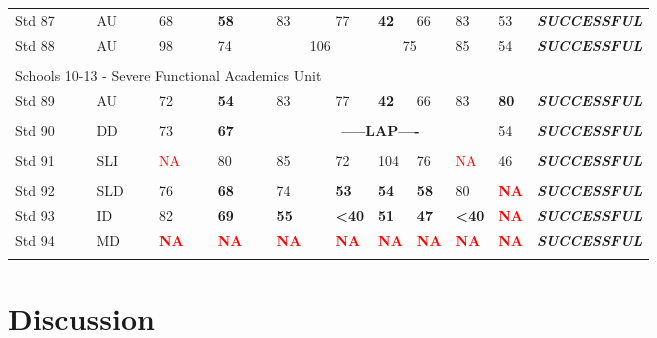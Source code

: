 \documentclass[twoside]{article}
\begin{document}
\begin{tiny}
\begin{landscape}
\begin{longtable}{p{1.5cm}p{1.5cm}p{1.5cm}p{1.5cm}p{1.75cm}p{1.75cm}p{1.75cm}p{1.75cm}p{1.75cm}p{1.75cm}p{2.5cm}@{}}
Std 87 & AU & 68 & \textbf{58} & 83 & 77 & \textbf{42} & 66 & 83 & 53 & \textbf{\textit{SUCCESSFUL}}\\
Std 88 & AU & 98 & 74 & \multicolumn{2}{c}{106} & \multicolumn{2}{c}{75} & 85 & 54 & \textbf{\textit{SUCCESSFUL}}\\
\hline \\
%
\multicolumn {5}{l}{Schools 10-13 - Severe Functional Academics Unit} & & & & & &\\
\cmidrule(lr){1-2}
Std 89 & AU & 72 & \textbf{54} & 83 & 77 & \textbf{42} & 66 & 83 & \textbf{80} & \textbf{\textit{SUCCESSFUL}}\\
\hline\\
Std 90 & DD & 73 & \textbf{67} & \multicolumn{5}{c}{\textbf{-----LAP----}}& 54 & \textbf{\textit{SUCCESSFUL}} \\
\hline\\
Std 91 & SLI & \textcolor{red}{NA} & 80 & 85 & 72 & 104 & 76 & \textcolor{red}{NA} & 46 & \textbf{\textit{SUCCESSFUL}} \\
\hline\\
Std 92 & SLD & 76 & \textbf{68} & 74 & \textbf{53} & \textbf{54} & \textbf{58} & 80 & \textcolor{red}{\textbf{NA}} & \textbf{\textit{SUCCESSFUL}} \\
Std 93 & ID & 82 & \textbf{69} & \textbf{55} & \textbf{<40} & \textbf{51} & \textbf{47} & \textbf{<40} & \textcolor{red}{\textbf{NA}}  & \textbf{\textit{SUCCESSFUL}} \\
Std 94 & MD & \textcolor{red}{\textbf{NA}} & \textcolor{red}{\textbf{NA}} & \textcolor{red}{\textbf{NA}} & \textcolor{red}{\textbf{NA}} & \textcolor{red}{\textbf{NA}} & \textcolor{red}{\textbf{NA}} & \textcolor{red}{\textbf{NA}} & \textcolor{red}{\textbf{NA}} & \textbf{\textit{SUCCESSFUL}} \\
\hline \\
\end{longtable}
\end{landscape}
\end{tiny}
%
%
%
\section{Discussion}
\end{document}
